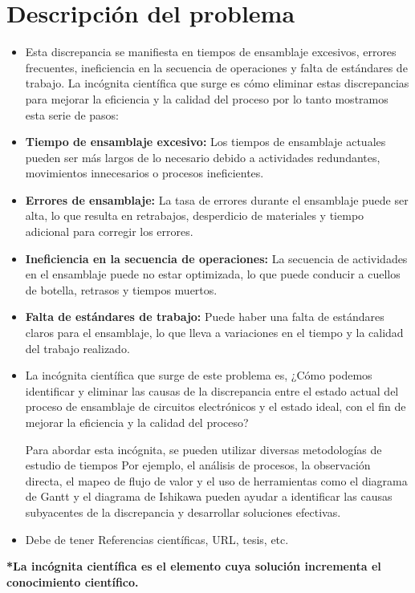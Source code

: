     \section{Descripción del problema}
    \begin{itemize}
    \item Esta discrepancia se manifiesta en tiempos de ensamblaje excesivos, errores frecuentes, ineficiencia en la secuencia de operaciones y falta de estándares de trabajo. La incógnita científica que surge es cómo eliminar estas discrepancias para mejorar la eficiencia y la calidad del proceso por lo tanto mostramos esta serie de pasos:
         \item \textbf{Tiempo de ensamblaje excesivo: }Los tiempos de ensamblaje actuales pueden ser más largos de lo necesario debido a actividades redundantes, movimientos innecesarios o procesos ineficientes.
    \item \textbf{Errores de ensamblaje:}
    La tasa de errores durante el ensamblaje puede ser alta, lo que resulta en retrabajos, desperdicio de materiales y tiempo adicional para corregir los errores.
    \item \textbf{Ineficiencia en la secuencia de operaciones:}
     La secuencia de actividades en el ensamblaje puede no estar optimizada, lo que puede conducir a cuellos de botella, retrasos y tiempos muertos.
    \item \textbf{Falta de estándares de trabajo:}
     Puede haber una falta de estándares claros para el ensamblaje, lo que lleva a variaciones en el tiempo y la calidad del trabajo realizado.
    \item La incógnita científica que surge de este problema es, ¿Cómo podemos identificar y eliminar las causas de la discrepancia entre el estado actual del proceso de ensamblaje de circuitos electrónicos y el estado ideal, con el fin de mejorar la eficiencia y la calidad del proceso?
    
    Para abordar esta incógnita, se pueden utilizar diversas metodologías de estudio de tiempos Por ejemplo, el análisis de procesos, la observación directa, el mapeo de flujo de valor y el uso de herramientas como el diagrama de Gantt y el diagrama de Ishikawa pueden ayudar a identificar las causas subyacentes de la discrepancia y desarrollar soluciones efectivas.
        \item Debe de tener Referencias científicas, URL, tesis, etc.
    \end{itemize}
    
    \textbf{*La incógnita científica es el elemento cuya solución incrementa el conocimiento científico.}
